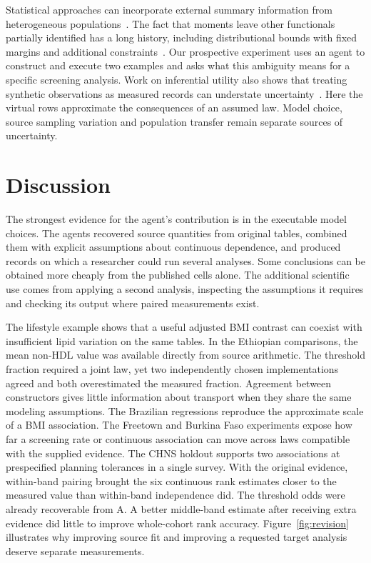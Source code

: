 \documentclass[sigconf,anonymous,review]{acmart}
\begin{document}
Statistical approaches can incorporate external summary information from heterogeneous populations~\cite{syndi}. The fact that moments leave other functionals partially identified has a long history, including distributional bounds with fixed margins and additional constraints~\cite{bounds,makarov,zaev}. Our prospective experiment uses an agent to construct and execute two examples and asks what this ambiguity means for a specific screening analysis. Work on inferential utility also shows that treating synthetic observations as measured records can understate uncertainty~\cite{inferential}. Here the virtual rows approximate the consequences of an assumed law. Model choice, source sampling variation and population transfer remain separate sources of uncertainty.

\section{Discussion}
The strongest evidence for the agent's contribution is in the executable model choices. The agents recovered source quantities from original tables, combined them with explicit assumptions about continuous dependence, and produced records on which a researcher could run several analyses. Some conclusions can be obtained more cheaply from the published cells alone. The additional scientific use comes from applying a second analysis, inspecting the assumptions it requires and checking its output where paired measurements exist.

The lifestyle example shows that a useful adjusted BMI contrast can coexist with insufficient lipid variation on the same tables. In the Ethiopian comparisons, the mean non-HDL value was available directly from source arithmetic. The threshold fraction required a joint law, yet two independently chosen implementations agreed and both overestimated the measured fraction. Agreement between constructors gives little information about transport when they share the same modeling assumptions. The Brazilian regressions reproduce the approximate scale of a BMI association. The Freetown and Burkina Faso experiments expose how far a screening rate or continuous association can move across laws compatible with the supplied evidence. The CHNS holdout supports two associations at prespecified planning tolerances in a single survey. With the original evidence, within-band pairing brought the six continuous rank estimates closer to the measured value than within-band independence did. The threshold odds were already recoverable from A. A better middle-band estimate after receiving extra evidence did little to improve whole-cohort rank accuracy. Figure~\ref{fig:revision} illustrates why improving source fit and improving a requested target analysis deserve separate measurements.
\end{document}
